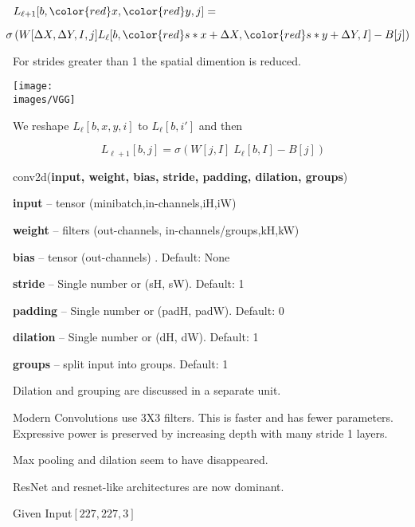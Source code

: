 {\vfill
$L_{{\ell+1}}[b,{\color{red}x},{\color{red}y},j] =$

$$\hspace{-1em}\sigma\left(W[\Delta X, \Delta Y, I, j] L_{{\ell}}[b,{\color{red} s*x} + \Delta X, {\color{red} s*y} + \Delta Y, I] - B[j]\right)$$

\vfill
For strides greater than 1 the spatial dimention is reduced.



\centerline{\texttt{[image: \\images/VGG]}}



We reshape $L_{{\ell}}[b,x,y,i]$ to $L_{{\ell}}[b,i']$ and then

\vfill
$$L_{{\ell+1}}[b,j] = \sigma\left(W[j,I]\;L_{{\ell}}[b,I] - B[j]\right)$$


conv2d({\bf input, weight, bias, stride, padding, dilation, groups})

\bigskip
{\bf input} – tensor (minibatch,in-channels,iH,iW)

\medskip
{\bf weight} – filters (out-channels, in-channels/groups,kH,kW)

\medskip
{\bf bias} – tensor (out-channels) . Default: None

\medskip
{\bf stride} – Single number or (sH, sW). Default: 1

\medskip
{\bf padding} – Single number or (padH, padW). Default: 0

\medskip
{\bf dilation} – Single number or (dH, dW). Default: 1

\medskip
{\bf groups} – split input into groups. Default: 1

\vfill
Dilation and grouping are discussed in a separate unit.


Modern Convolutions use 3X3 filters.  This is faster and has fewer parameters.  Expressive power is preserved by increasing depth with many stride 1 layers.

\vfill
Max pooling and dilation seem to have disappeared.

\vfill
ResNet and resnet-like architectures are now dominant.

{\huge
\centerline{Given Input$[227,227,3]$}

}}
